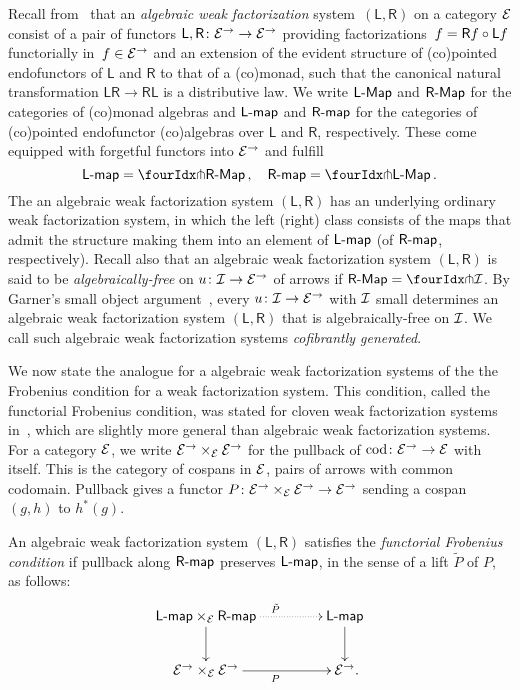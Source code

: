 \documentclass[reqno,10pt,a4paper,oneside,draft]{amsart}
\newcommand{\LL}{\mathsf{L}}
\newcommand{\RR}{\mathsf{R}}
\begin{document}
{{Recall from~\cite{garner:small-object-argument,grandis-tholen-nwfs} that an \emph{algebraic weak factorization} system~$(\LL, \RR)$ on a category $\cal{E}$ consist of a pair of functors $\LL, \RR \co \cal{E}^\to \to \cal{E}^\to$ providing factorizations~$f = \RR f \cc \LL f$ functorially in~$f \in \cal{E}^\to$ and an extension of the 
evident structure of (co)pointed endofunctors of $\LL$ and $\RR$ to that of a (co)monad, such that the canonical natural transformation $\LL \RR \to \RR \LL$ is a distributive law. 
We write $\pCoalg{\LL}$ and $\pAlg{\RR}$ for the categories of (co)monad algebras and $\pcoalg{\LL}$ and $\palg{\RR}$ for the categories of (co)pointed endofunctor (co)algebras over $\LL$ and $\RR$, respectively.
These come equipped with forgetful functors into $\cal{E}^\to$ and fulfill 
\[
\pcoalg{\LL} = \liftl{\pAlg{\RR}} \, , \quad \palg{\RR} = \liftr{\pCoalg{\LL}} \, .
\]
The an algebraic weak factorization system $(\LL, \RR)$ has an underlying ordinary weak factorization system, in which the left (right) class 
consists of the maps that admit the structure making them into an element of $\pcoalg{\LL}$ (of $\palg{\RR}$, respectively). Recall also that an algebraic weak factorization system 
$(\LL, \RR)$ is said to be \emph{algebraically-free} on $u \co \cal{I} \to \cal{E}^\to$ of arrows if $\pAlg{\RR} = \liftr{\cal{I}}$. By Garner's small object argument~\cite{garner:small-object-argument}, every $u \co \cal{I} \to \cal{E}^\to$ with $\cal{I}$ small determines an algebraic weak factorization system $(\LL, \RR)$ that is algebraically-free on $\cal{I}$. We call such algebraic
weak factorization systems \emph{cofibrantly generated}.


We now state the analogue for a algebraic weak factorization systems of the the Frobenius condition for a weak factorization system.
This condition, called the functorial Frobenius condition, was stated for cloven weak factorization systems in~\cite{garner:topological-simplicial},
which are slightly more general than algebraic weak factorization systems. For a category $\cal{E}$, we write $\cal{E}^\to \times_\cal{E} \cal{E}^\to$
for the pullback of $\cod \co \cal{E}^\to \to \cal{E}$ with itself. This is the category of cospans in
$\cal{E}$, \ie pairs of arrows with common codomain. Pullback gives a functor
$P \co  \cal{E}^\to \times_{\cal{E}} \cal{E}^\to \to \cal{E}^\to$
sending a cospan $(g, h)$ to $h^*(g)$.





\begin{definition} \label{functorial-frobenius}
An algebraic weak factorization system $(\LL, \RR)$ satisfies the \emph{functorial Frobenius condition} if pullback along $\palg{\RR}$
preserves $\pcoalg{\LL}$, in the sense of a lift $\tilde{P}$ of $P$, as follows:
\[
\xymatrix@C+2em{
  \pcoalg{\LL} \times_{\cal{E}} \palg{\RR}
  \ar@{.>}[r]^{\tilde{P}}
  \ar[d]
&
  \pcoalg{\LL}
  \ar[d]
\\
  \cal{E}^\to \times_{\cal{E}} \cal{E}^\to
  \ar[r]_{P}
&
  \cal{E}^\to
\rlap{.}}
\]
\end{definition}

}}
\end{document}
